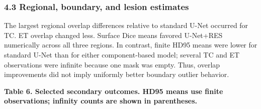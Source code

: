 \documentclass[
  10pt,
  letterpaper,
]{article}
\begin{document}
\subsubsection{4.3 Regional, boundary, and lesion
estimates}\label{regional-boundary-and-lesion-estimates}

The largest regional overlap differences relative to standard U-Net
occurred for TC. ET overlap changed less. Surface Dice means favored
U-Net+RES numerically across all three regions. In contrast, finite HD95
means were lower for standard U-Net than for either component-based
model; several TC and ET observations were infinite because one mask was
empty. Thus, overlap improvements did not imply uniformly better
boundary outlier behavior.

\textbf{Table 6. Selected secondary outcomes. HD95 means use finite
observations; infinity counts are shown in parentheses.}
\end{document}
